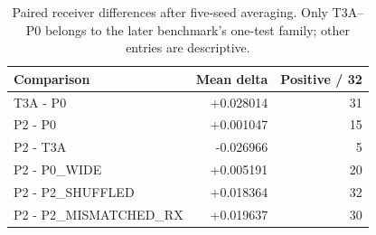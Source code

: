 \begin{table}[t]
\centering
\caption{Paired receiver differences after five-seed averaging. Only T3A--P0 belongs to the later benchmark's one-test family; other entries are descriptive.}
\label{tab:paired}
\small
\begin{tabular}{lrr}
\toprule
Comparison & Mean delta & Positive / 32\\
\midrule
T3A - P0 & +0.028014 & 31\\
P2 - P0 & +0.001047 & 15\\
P2 - T3A & -0.026966 & 5\\
P2 - P0\_WIDE & +0.005191 & 20\\
P2 - P2\_SHUFFLED & +0.018364 & 32\\
P2 - P2\_MISMATCHED\_RX & +0.019637 & 30\\
\bottomrule
\end{tabular}
\end{table}
